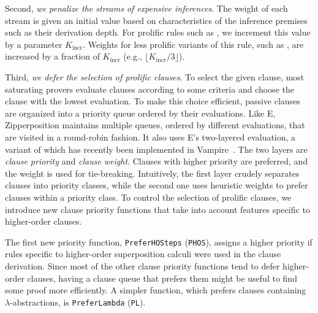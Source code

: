 \newcommand\ParamPenaltyIncrease{\ensuremath{K_\mathrm{incr}}}
Second, \emph{we penalize the streams of expensive inferences}. The weight of
each stream is given an initial value based on characteristics of the inference
premises such as their derivation depth. For prolific rules such as
, we increment this value by a parameter \ParamPenaltyIncrease. Weights for
less prolific variants of this rule, such as  \cite{bbtvw-21-sup-lam}, are increased by a
fraction of $\ParamPenaltyIncrease$ (e.g., $\lfloor \ParamPenaltyIncrease/3 \rfloor$).

Third, \emph{we defer the selection of prolific clauses}. To select the given
clause, most saturating provers evaluate clauses according to some criteria and
choose the clause with the lowest evaluation. To make this choice efficient,
passive clauses are organized into a priority queue ordered by their
evaluations. Like E, Zipper\-position maintains multiple
queues, ordered by different evaluations, that are visited in a round-robin
fashion. It also uses E's two-layered evaluation, a variant of which
has recently been implemented in Vampire~\cite{gs-20-clausesel}.
%
The two layers are \emph{clause priority} and \emph{clause weight}. Clauses
with higher priority are preferred, and the weight is used for tie-breaking.
Intuitively, the first layer crudely separates clauses into priority classes,
while the second one uses heuristic weights to prefer clauses within a
priority class. To control the selection of prolific clauses, we introduce new
clause priority functions that take into account features specific to
higher-order clauses.

The first new priority function, \verb|PreferHOSteps| (\verb|PHOS|), assigns a
higher priority if rules specific to higher-order superposition calculi
were used in the clause derivation. Since most of the other clause priority
functions tend to defer higher-order clauses, having a clause queue that prefers
them might be useful to find some proof more
efficiently. A simpler function, which prefers clauses containing
$\lambda$-abstractions, is \verb|PreferLambda| (\verb|PL|).

